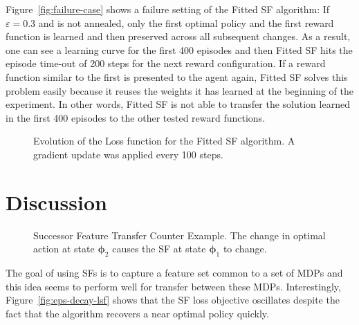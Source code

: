 \documentclass{article}
\begin{document}
Figure~\ref{fig:failure-case} shows a failure setting of the Fitted SF algorithm: 
If $\varepsilon = 0.3$ and is not annealed, only the first optimal policy and the first reward function is learned and then preserved across all subsequent changes.
As a result, one can see a learning curve for the first 400 episodes and then Fitted SF hits the episode time-out of 200 steps for the next reward configuration.
If a reward function similar to the first is presented to the agent again, Fitted SF solves this problem easily because it reuses the weights it has learned at the beginning of the experiment.
In other words, Fitted SF is not able to transfer the solution learned in the first 400 episodes to the other tested reward functions.

\begin{figure}
\centering
\vspace{-0.5cm}
\caption{Evolution of the Loss function for the Fitted SF algorithm. A gradient update was applied every 100 steps.}
\label{fig:eps-decay-loss}
\vspace{-0.3cm}
\end{figure}

\section{Discussion}

\begin{figure*}
\centering

\caption{Successor Feature Transfer Counter Example. The change in optimal action at state $\pmb{\phi}_2$ causes the SF at state $\pmb{\phi}_1$ to change.}
\label{fig:sf_counter_example}
\end{figure*}

The goal of using SFs is to capture a feature set common to a set of MDPs and this idea seems to perform well for transfer between these MDPs. 
Interestingly, Figure~\ref{fig:eps-decay-lsf} shows that the SF loss objective oscillates despite the fact that the algorithm recovers a near optimal policy quickly.
\end{document}
